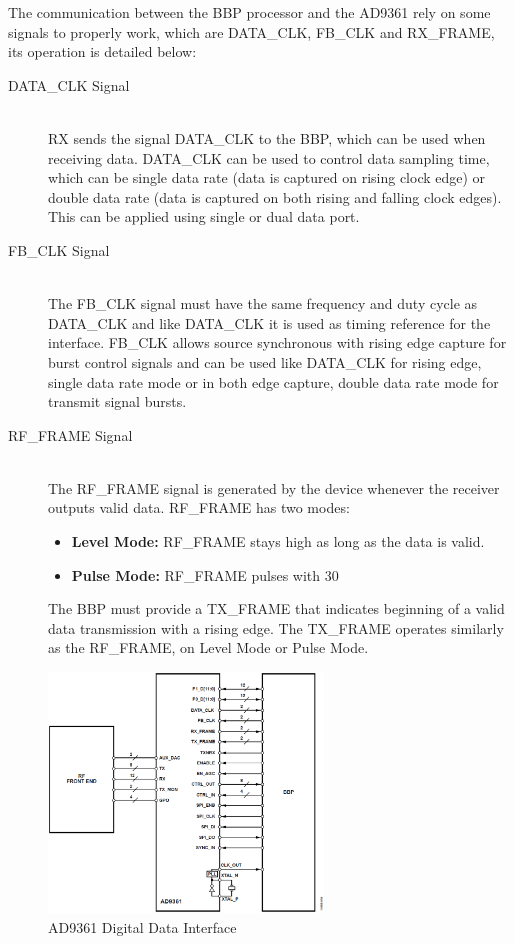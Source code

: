 The communication between the BBP processor and the AD9361
rely on some signals to properly work, which are DATA\_CLK, FB\_CLK and
RX\_FRAME, its operation is detailed below:

\begin{description}
	\item[DATA\_CLK Signal] \hfill \\
	 RX sends the signal DATA\_CLK to the BBP, which can be used when receiving data.
   DATA\_CLK can be used to control data sampling time, which can be single data
   rate (data is captured on rising clock edge) or double data rate (data is
   captured on both rising and falling clock edges). This can be applied using
   single or dual data port.

	\item[FB\_CLK Signal] \hfill \\
	The FB\_CLK signal must have the same frequency and duty cycle as DATA\_CLK and
like DATA\_CLK it is used as timing reference for the interface. FB\_CLK allows
source synchronous with rising edge capture for burst control signals and can be
used like DATA\_CLK for rising edge, single data rate mode or in both edge
capture, double data rate mode for transmit signal bursts.

	\item[RF\_FRAME Signal] \hfill \\
	The RF\_FRAME signal is generated by the device whenever the receiver outputs
valid data. RF\_FRAME has two modes:
	\begin{itemize}
		\item \textbf{Level Mode:} RF\_FRAME stays high as long as the data is valid.
		\item \textbf{Pulse Mode:} RF\_FRAME pulses with 30%
	\end{itemize}
	The BBP must provide a TX\_FRAME that indicates beginning of a valid data
transmission with a rising edge. The TX\_FRAME operates similarly as the
RF\_FRAME, on Level Mode or Pulse Mode.

\end{description}

\begin{figure}[htbp]
    \centering
    \includegraphics[width=0.65\textwidth]{./figures/ad9361_digital_interface}
    \caption{ AD9361 Digital Data Interface
    \label{fig:ad9361diginterface}}
\end{figure}


